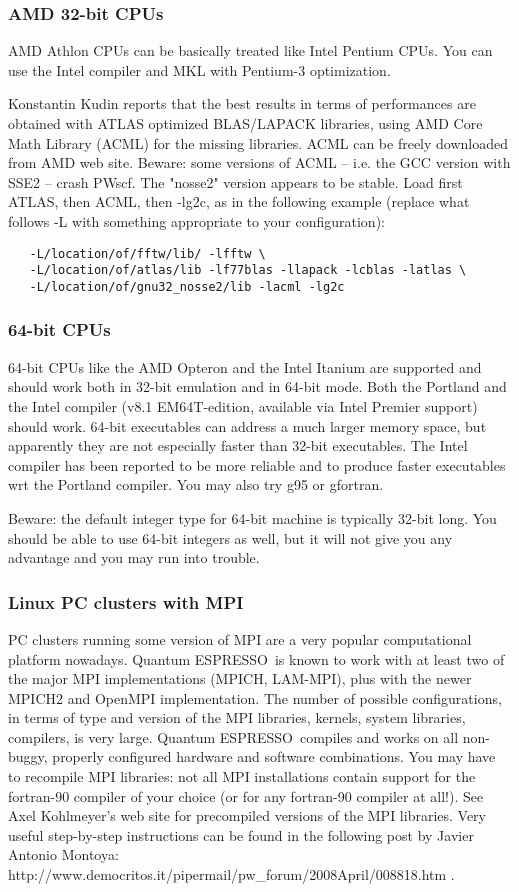 \documentclass[12pt,a4paper]{article}
\def\qe{{\sc Quantum ESPRESSO}}
\begin{document}
\subsubsection{AMD 32-bit CPUs}
AMD Athlon CPUs can be basically treated like Intel Pentium CPUs. You
can use the Intel compiler and MKL with Pentium-3 optimization.

Konstantin Kudin reports that the best results in terms of performances
are obtained with ATLAS optimized BLAS/LAPACK libraries, using AMD
Core Math Library (ACML) for the missing libraries. ACML can be freely
downloaded from AMD web site. Beware: some versions of ACML -- i.e.
the GCC version with SSE2 -- crash PWscf. The "nosse2" version appears
to be stable. Load first ATLAS, then ACML, then -lg2c, as in the
following example (replace what follows -L with something appropriate
to your configuration):
  \begin{verbatim}
   -L/location/of/fftw/lib/ -lfftw \
   -L/location/of/atlas/lib -lf77blas -llapack -lcblas -latlas \
   -L/location/of/gnu32_nosse2/lib -lacml -lg2c
\end{verbatim}

\subsubsection{64-bit CPUs}
64-bit CPUs like the AMD Opteron and the Intel Itanium are supported and
should work both in 32-bit emulation and in 64-bit mode. Both the Portland
and the Intel compiler (v8.1 EM64T-edition, available via Intel
Premier support) should work. 64-bit executables can address a much
larger memory space, but apparently they are not especially faster
than 32-bit executables. 
The Intel compiler has been reported to be more reliable and to produce
faster executables wrt the Portland compiler. You may also try g95 or gfortran.

Beware: the default integer type for 64-bit machine is typically
32-bit long. You should be able to use 64-bit integers as well, 
but it will not give you any advantage and you may run into trouble.

\subsubsection{Linux PC clusters with MPI}
\label{Sec:LinuxPCMPI}
PC clusters running some version of MPI are a very popular
computational platform nowadays. \qe\ is known to work
with at least two of the major MPI implementations (MPICH, LAM-MPI),
plus with the newer MPICH2 and OpenMPI implementation. The number of
possible configurations, in terms of type and version of the MPI
libraries, kernels, system libraries, compilers, is very
large. \qe\ compiles and works on all non-buggy, properly
configured hardware and software combinations. You may have to
recompile MPI libraries: not all MPI installations contain support for
the fortran-90 compiler of your choice (or for any fortran-90 compiler
at all!).  See Axel Kohlmeyer's web site for precompiled versions of
the MPI libraries.  Very useful step-by-step instructions can be found
in the following post by  Javier Antonio Montoya:\\
http://www.democritos.it/pipermail/pw\_forum/2008April/008818.htm . 
\end{document}
